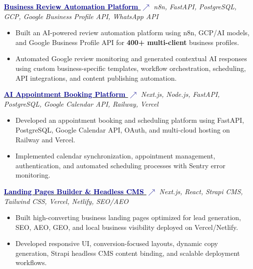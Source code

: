 \documentclass[10.5pt]{article}
\newcommand{\faExternalLink}{$\nearrow$}
\begin{document}
\noindent\href{https://review.inddigmedia.in/}{\textbf{\textcolor{darkblue}{Business Review Automation Platform \faExternalLink}}} \hfill \textit{\small\color{medgray}n8n, FastAPI, PostgreSQL, GCP, Google Business Profile API, WhatsApp API}
\begin{itemize}
\item Built an AI-powered review automation platform using n8n, GCP/AI models, and Google Business Profile API for \textbf{400+ multi-client} business profiles.
\item Automated Google review monitoring and generated contextual AI responses using custom business-specific templates, workflow orchestration, scheduling, API integrations, and content publishing automation.
\end{itemize}

\vspace{2pt}

\noindent\href{https://app.makeappointments.in/}{\textbf{\textcolor{darkblue}{AI Appointment Booking Platform \faExternalLink}}} \hfill \textit{\small\color{medgray}Next.js, Node.js, FastAPI, PostgreSQL, Google Calendar API, Railway, Vercel}
\begin{itemize}
\item Developed an appointment booking and scheduling platform using FastAPI, PostgreSQL, Google Calendar API, OAuth, and multi-cloud hosting on Railway and Vercel.
\item Implemented calendar synchronization, appointment management, authentication, and automated scheduling processes with Sentry error monitoring.
\end{itemize}

\vspace{2pt}

\noindent\href{https://landingpages.inddigmedia.in/}{\textbf{\textcolor{darkblue}{Landing Pages Builder \& Headless CMS \faExternalLink}}} \hfill \textit{\small\color{medgray}Next.js, React, Strapi CMS, Tailwind CSS, Vercel, Netlify, SEO/AEO}
\begin{itemize}
\item Built high-converting business landing pages optimized for lead generation, SEO, AEO, GEO, and local business visibility deployed on Vercel/Netlify.
\item Developed responsive UI, conversion-focused layouts, dynamic copy generation, Strapi headless CMS content binding, and scalable deployment workflows.
\end{itemize}
\end{document}
